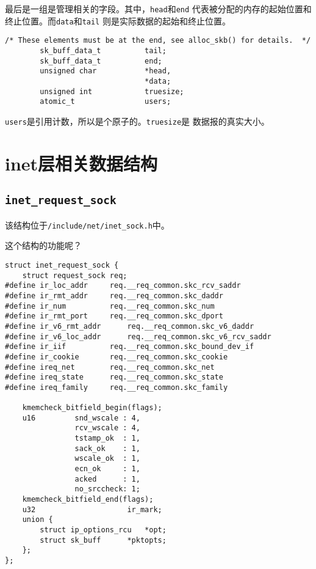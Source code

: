 最后是一组是管理相关的字段。其中，\texttt{head}和\texttt{end}
代表被分配的内存的起始位置和终止位置。而\texttt{data}和\texttt{tail}
则是实际数据的起始和终止位置。
\begin{verbatim}
/* These elements must be at the end, see alloc_skb() for details.  */
        sk_buff_data_t          tail;
        sk_buff_data_t          end;
        unsigned char           *head,
                                *data;
        unsigned int            truesize;
        atomic_t                users;
\end{verbatim}
\texttt{users}是引用计数，所以是个原子的。\texttt{truesize}是
数据报的真实大小。
    \section{inet层相关数据结构}    
        \subsection{\texttt{inet_request_sock}}

        该结构位于\texttt{/include/net/inet_sock.h}中。

        这个结构的功能呢？

\begin{verbatim}
struct inet_request_sock {
    struct request_sock req;
#define ir_loc_addr     req.__req_common.skc_rcv_saddr
#define ir_rmt_addr     req.__req_common.skc_daddr
#define ir_num          req.__req_common.skc_num
#define ir_rmt_port     req.__req_common.skc_dport
#define ir_v6_rmt_addr      req.__req_common.skc_v6_daddr
#define ir_v6_loc_addr      req.__req_common.skc_v6_rcv_saddr
#define ir_iif          req.__req_common.skc_bound_dev_if
#define ir_cookie       req.__req_common.skc_cookie
#define ireq_net        req.__req_common.skc_net
#define ireq_state      req.__req_common.skc_state
#define ireq_family     req.__req_common.skc_family

    kmemcheck_bitfield_begin(flags);
    u16         snd_wscale : 4,
                rcv_wscale : 4,
                tstamp_ok  : 1,
                sack_ok    : 1,
                wscale_ok  : 1,
                ecn_ok     : 1,
                acked      : 1,
                no_srccheck: 1;
    kmemcheck_bitfield_end(flags);
    u32                     ir_mark;
    union {
        struct ip_options_rcu   *opt;
        struct sk_buff      *pktopts;
    };
};
\end{verbatim}     
